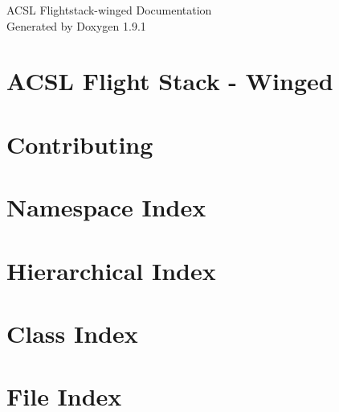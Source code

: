 \let\mypdfximage\pdfximage\def\pdfximage{\immediate\mypdfximage}\documentclass[twoside]{book}
\newcommand{\+}{\discretionary{\mbox{\scriptsize$\hookleftarrow$}}{}{}}
\newcommand{\clearemptydoublepage}{%
  \newpage{\pagestyle{empty}\cleardoublepage}%
}
\begin{document}
\raggedbottom

\hypersetup{pageanchor=false,
             bookmarksnumbered=true,
             pdfencoding=unicode
            }
\begin{titlepage}
\vspace*{7cm}
\begin{center}%
{\Large ACSL Flightstack-\/winged Documentation }\\
\vspace*{1cm}
{\large Generated by Doxygen 1.9.1}\\
\end{center}
\end{titlepage}
\clearemptydoublepage
{}
\tableofcontents
\clearemptydoublepage
{}
\hypersetup{pageanchor=true}

\chapter{ACSL Flight Stack -\/ Winged}
\label{index}\hypertarget{index}{}
\chapter{Contributing}
\label{md_ACSL_flightstack_winged_src_px4_msgs_CONTRIBUTING}

\chapter{Namespace Index}

\chapter{Hierarchical Index}

\chapter{Class Index}

\chapter{File Index}

\end{document}
